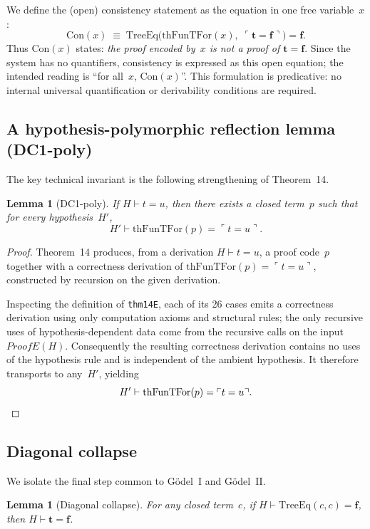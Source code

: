 \documentclass[11pt]{article}
\newtheorem{lemma}[theorem]{Lemma}
\newcommand{\trueT}{\mathbf{t}}
\newcommand{\falseT}{\mathbf{f}}
\newcommand{\code}[1]{\ulcorner #1 \urcorner}
\newcommand{\thFunTFor}{\mathrm{thFunTFor}}
\newcommand{\TreeEq}{\mathrm{TreeEq}}
\begin{document}
We define the (open) consistency statement as the equation in one
free variable~$x$:
\[
  \mathrm{Con}(x) \;\equiv\;
  \TreeEq\bigl(\thFunTFor(x),\;\code{\trueT = \falseT}\bigr) = \falseT.
\]
Thus $\mathrm{Con}(x)$ states: \emph{the proof encoded by~$x$ is
not a proof of $\trueT = \falseT$}.  Since the system has no
quantifiers, consistency is expressed as this open equation;
the intended reading is ``for all~$x$, $\mathrm{Con}(x)$''.
This formulation is predicative: no internal universal
quantification or derivability conditions are required.

\subsection{A hypothesis-polymorphic reflection lemma (DC1-poly)}

The key technical invariant is the following strengthening of
Theorem~14.

\begin{lemma}[DC1-poly]
\label{lem:dc1poly}
If $H \vdash t = u$, then there exists a closed term~$p$ such that
for every hypothesis~$H'$,
\[
  H' \vdash \thFunTFor(p) = \code{t = u}.
\]
\end{lemma}

\begin{proof}
Theorem~14 produces, from a derivation $H \vdash t = u$, a proof
code~$p$ together with a correctness derivation of
$\thFunTFor(p) = \code{t = u}$, constructed by recursion on the
given derivation.

Inspecting the definition of \texttt{thm14E}, each of its 26 cases
emits a correctness derivation using only computation axioms and
structural rules; the only recursive uses of hypothesis-dependent
data come from the recursive calls on the input $\mathit{ProofE}(H)$.
Consequently the resulting correctness derivation contains no
uses of the hypothesis rule and is independent of the ambient
hypothesis.  It therefore transports to any~$H'$, yielding
\[
  H' \vdash \thFunTFor(p) = \code{t = u}. \qedhere
\]
\end{proof}

\subsection{Diagonal collapse}

We isolate the final step common to G\"odel~I and G\"odel~II.

\begin{lemma}[Diagonal collapse]
\label{lem:diagCollapse}
For any closed term~$c$, if
$H \vdash \TreeEq(c, c) = \falseT$, then
$H \vdash \trueT = \falseT$.
\end{lemma}
\end{document}
